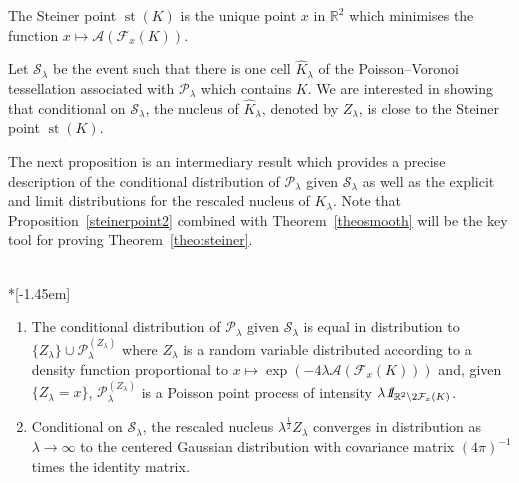 \documentclass[10pt]{amsart}
\theoremstyle{definition}\newtheorem{defi}[theo]{Definition}\newtheorem{rema}[theo]{Remark}\newtheorem{exam}[theo]{Example}\newtheorem{exem}[theo]{Example}\newtheorem{nota}[theo]{Notation}
\newcommand{\indicat}{{\text{1}}\negthickspace\text{I}}
\newcommand{\cA}{\mathcal{A}}
\newcommand{\cF}{\mathcal{F}}
\newcommand{\cP}{\mathcal{P}}
\newcommand{\scS}{\mathscr{S}}
\newcommand{\R}{\mathbb{R}}
\DeclareMathOperator{\st}{st}
\newcommand{\pass}{\vspace{0.3cm}\noindent}
\newcommand{\noi}{\noindent}
\newcommand*{\romanenumi}{\renewcommand*{\theenumi}{\roman{enumi}}}
\begin{document}
\begin{prop}\label{prop:newcharac}
The Steiner point $\st (K)$ is the unique point $x$ in $\R^2$ which minimises the function $x\longmapsto \cA(\cF_x(K))$.
\end{prop}

Let $\scS_{\lambda}$ be the event such that there is one cell $\widehat{K}_\lambda$ of the Poisson--Voronoi tessellation associated with $\cP_{\lambda}$ which contains $K$. We are interested in showing that conditional on $\scS_{\lambda}$, the nucleus of $\widehat{K}_\lambda$, denoted by $Z_{\lambda}$, is close to the Steiner point $\st (K)$.

The next proposition is an intermediary result which provides a precise description of the conditional distribution of $\cP_{\lambda}$ given $\scS_{\lambda}$ as well as the explicit and limit distributions for the rescaled nucleus of $K_{\lambda}$. Note that Proposition~\ref{steinerpoint2} combined with Theorem~\ref{theosmooth} will be the key tool for proving Theorem~\ref{theo:steiner}.

\begin{prop}\label{steinerpoint2}\ \\*[-1.45em]
\begin{enumerate}\romanenumi
\item \label{prop5.2.1} The conditional distribution of $\cP_\lambda$ given $\scS_\lambda$ is equal in distribution to $\{Z_{\lambda}\}\cup \cP^{(Z_\lambda)}_\lambda$ where $Z_\lambda$ is a random variable distributed according to a density function proportional to $x\longmapsto\exp(-4\lambda\cA(\cF_x(K)))$ and, given $\{Z_{\lambda}=x\}$, $\cP^{(Z_\lambda)}_\lambda$ is a Poisson point process of intensity $\lambda{\emph{\indicat}}_{\R^2\setminus 2\cF_x(K)}$.
\item \label{prop5.2.2}Conditional on $\scS_{\lambda}$, the rescaled nucleus $\lambda^{\frac{1}{2}}Z_{\lambda}$ converges in distribution as $\lambda\to\infty$ to the centered Gaussian distribution with covariance matrix $(4\pi)^{-1}$ times the identity matrix.
\end{enumerate}
\end{prop}
\goodbreak
\end{document}
